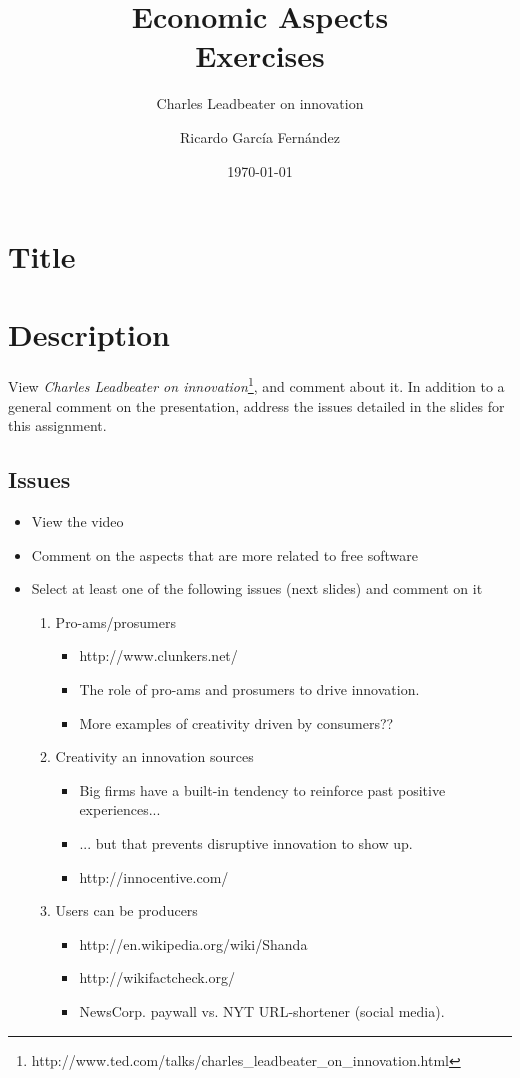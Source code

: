 \documentclass[11pt]{scrartcl}
\title{\textbf{Economic Aspects\\
                Exercises}}
\subtitle{Charles Leadbeater on innovation}
\author{Ricardo Garc\'ia Fern\'andez}
\date{\today}
\begin{document}
\maketitle

\section{Title}

\section{Description}

View \emph{Charles Leadbeater on innovation}\footnote{http://www.ted.com/talks/charles\_leadbeater\_on\_innovation.html}, and comment about it. In addition to a general comment on the presentation, address the issues detailed in the slides for this assignment.

\subsection{Issues}

\begin{itemize}
	\item View the video
    \item Comment on the aspects that are more related to free software
    \item Select at least one of the following issues (next slides) and comment on it
    \begin{enumerate}
	    \item Pro-ams/prosumers
	    \begin{itemize}
        	\item http://www.clunkers.net/
        	\item The role of pro-ams and prosumers to drive innovation.
        	\item More examples of creativity driven by consumers??
        \end{itemize}
        \item Creativity an innovation sources
        \begin{itemize}
	        \item Big firms have a built-in tendency to reinforce past positive experiences...
	        \item ... but that prevents disruptive innovation to show up.
	        \item http://innocentive.com/
        \end{itemize}
        \item Users can be producers
        \begin{itemize}
	        \item http://en.wikipedia.org/wiki/Shanda
	        \item http://wikifactcheck.org/
	        \item NewsCorp. paywall vs. NYT URL-shortener (social media).
        \end{itemize}
    \end{enumerate}
\end{itemize}
\end{document}
